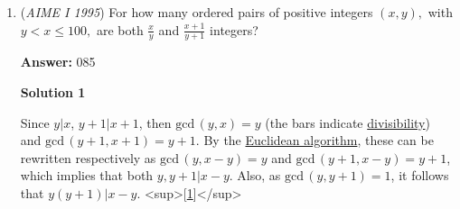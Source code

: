 \begin{enumerate}
 



\textbf{Solution 2}

Let $(1 - \sin t)(1 - \cos t) = x$. Multiplying $x$ with the given equation, $\frac{5x}{4} = (1 - \sin^2 t)(1 - \cos^2 t) = \sin^2 t \cos ^2 t$, and $\frac{\sqrt{5x}}{2} = \sin t \cos t$. Simplifying and rearranging the given equation, $\sin t + \cos t = \frac{5}{4} - (\sin^2 t + \cos^2 t) - \sin t \cos t = \frac{1}{4} - \frac{\sqrt{5x}}{2}$. Notice that $(1 + \sin t)(1 + \cos t) - 2(\sin t + \cos t) = x$, and substituting, $x = \frac{5}{4} - 2( \frac{1}{4} - \frac{\sqrt{5x}}{2}) = \frac{3}{4} + \sqrt{5x}$. Rearranging and squaring, $5x = x^2 - \frac{3}{2} x + \frac{9}{16}$, so $x^2 - \frac{13}{2} x + \frac{9}{16} = 0$, and $x = \frac{13}{4} \pm \sqrt{10}$, but clearly, $0 \leq x < 4$. Therefore, $x = \frac{13}{4} - \sqrt{10}$, and the answer is $13 + 4 + 10 = \boxed{027}$.

 



\textbf{Solution 3}

We want $1+\sin t \cos t-\sin t-\cos t$. However, note that we only need to find $\sin t+\cos t$.

 Let $y = \sin t+\cos t \rightarrow y^2 = \sin^2 t + \cos^2 t + 2\sin t \cos t = 1 + 2\sin t \cos t$

 From this we have $\sin t \cos t = \frac{y^2-1}{2}$ and $\sin t + \cos t = y$

 Substituting, we have $2y^2+4y-3=0 \rightarrow y = \frac {-2 \pm \sqrt{10}}{2}$
$\frac{5}{4} - 2(\frac{-2+\sqrt{10}}{2}) = \frac{13}{4}-\sqrt{10} \rightarrow 13+10+4=\boxed{027}$.

 


	\item (\textit{AIME I 1995}) For how many ordered pairs of positive integers $(x,y),$ with $y<x\le 100,$ are both $\frac xy$ and $\frac{x+1}{y+1}$ integers?


 
 \textbf{Answer: }085



\textbf{Solution 1}

Since $y|x$, $y+1|x+1$, then $\text{gcd}\,(y,x)=y$ (the bars indicate \href{https://artofproblemsolving.com/wiki/index.php?title=Divisibility}{divisibility}) and $\text{gcd}\,(y+1,x+1)=y+1$. By the \href{https://artofproblemsolving.com/wiki/index.php?title=Euclidean\_algorithm}{Euclidean algorithm}, these can be rewritten respectively as $\text{gcd}\,(y,x-y)=y$ and $\text{gcd}\, (y+1,x-y)=y+1$, which implies that both $y,y+1 | x-y$. Also, as $\text{gcd}\,(y,y+1) = 1$, it follows that $y(y+1)|x-y$. <sup>[\href{https://artofproblemsolving.com\#note\_1}{1}]</sup>


\end{enumerate}
